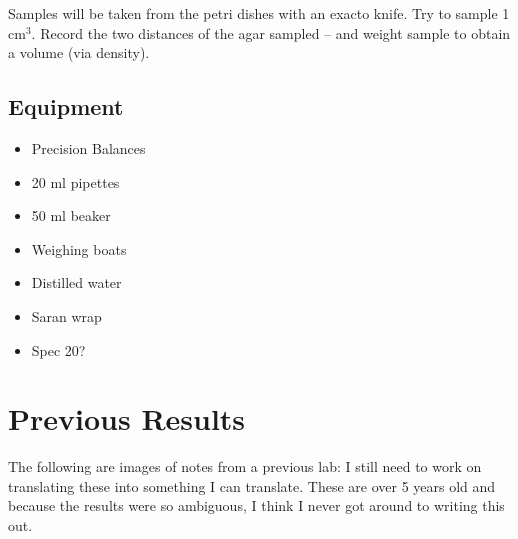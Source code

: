 \documentclass{article}
\begin{document}



Samples will be taken from the petri dishes with an exacto knife. Try to sample 1 cm$^3$. Record the two distances of the agar sampled -- and weight sample to obtain a volume (via density).

\subsection{Equipment}
 
\begin{itemize}
	\item Precision Balances
	\item 20 ml pipettes
	\item 50 ml beaker
	\item	Weighing boats
	\item	Distilled water
	\item Saran wrap
	\item Spec 20?
\end{itemize}
	

\section{Previous Results}

The following are images of notes from a previous lab: I still need to work on translating these into something I can translate. These are over 5 years old and because the results were so ambiguous, I think I never got around to writing this out.

\begin{figure}
	\label{fig:IMG_0578}
\end{figure}
\end{document}
